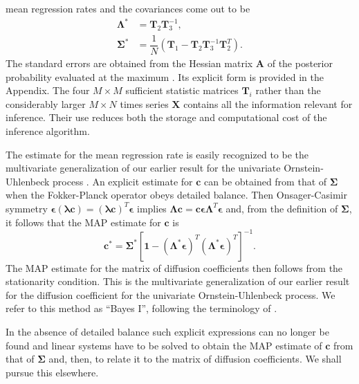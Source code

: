 \documentclass[english,aps, twocolumn, pre,superscriptaddress, notitlepage]{revtex4-1}
\begin{document}
mean regression rates and the covariances come out to be\begin{subequations}\label{eq:mapBayesI}
\begin{align}
\bm{\bm{\Lambda}^{\ast}} & =\bm{T}_{2}\boldsymbol{T}_{3}^{-1},\label{eq:map_lambda}\\
\bm{\Sigma^{\ast}} & =\dfrac{1}{N}\left(\bm{T}_{1}-\boldsymbol{T}_{2}\boldsymbol{T}_{3}^{-1}\boldsymbol{T}_{2}^{T}\right).\label{eq:map_sigma}
\end{align}
\end{subequations}The standard errors are obtained from the Hessian
matrix $\bm{A}$ of the posterior probability evaluated at the maximum
\cite{jeffreys1998theory,jaynes2003probability,sivia2006data}. Its
explicit form is provided in the Appendix. The four $M\times M$ sufficient
statistic matrices $\boldsymbol{T}_{i}$ rather than the considerably
larger $M\times N$ times series $\boldsymbol{X}$ contains all the
information relevant for inference. Their use reduces both the storage
and computational cost of the inference algorithm. 

The estimate for the mean regression rate is easily recognized to
be the multivariate generalization of our earlier result for the univariate
Ornstein-Uhlenbeck process \cite{bera2017fast}. An explicit estimate
for $\boldsymbol{c}$ can be obtained from that of $\boldsymbol{\Sigma}$
when the Fokker-Planck operator obeys detailed balance. Then Onsager-Casimir
symmetry $\boldsymbol{\epsilon}(\boldsymbol{\lambda c})=(\boldsymbol{\lambda c})^{T}\boldsymbol{\epsilon}$
implies $\boldsymbol{\Lambda}\boldsymbol{c}=\boldsymbol{c}\boldsymbol{\epsilon}\boldsymbol{\Lambda}^{T}\boldsymbol{\epsilon}$
and, from the definition of $\boldsymbol{\Sigma}$, it follows that
the MAP estimate for $\boldsymbol{c}$ is
\begin{equation}
\boldsymbol{c}^{\ast}=\boldsymbol{\Sigma}^{\ast}\left[\boldsymbol{1}-(\boldsymbol{\Lambda}^{\ast}\boldsymbol{\epsilon})^{T}(\boldsymbol{\Lambda}^{\ast}\boldsymbol{\epsilon})^{T}\right]^{-1}.\label{eq:covariance-OC}
\end{equation}
The MAP estimate for the matrix of diffusion coefficients then follows
from the stationarity condition. This is the multivariate generalization
of our earlier result for the diffusion coefficient for the univariate
Ornstein-Uhlenbeck process. We refer to this method as ``Bayes I'',
following the terminology of \cite{bera2017fast}.

In the absence of detailed balance such explicit expressions can no
longer be found and linear systems have to be solved to obtain the
MAP estimate of $\boldsymbol{c}$ from that of $\boldsymbol{\Sigma}$
and, then, to relate it to the matrix of diffusion coefficients. We
shall pursue this elsewhere. 
\end{document}
